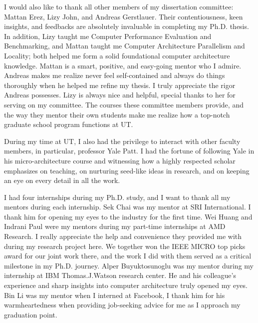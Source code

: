 \begin{acknowledgments}
I would also like to thank all other members of my dissertation committee: Mattan Erez, Lizy John, and Andreas Gerstlauer. Their contentiousness, keen insights, and feedbacks are absolutely invaluable in completing my Ph.D. thesis. In addition, Lizy taught me Computer Performance Evaluation and Benchmarking, and Mattan taught me Computer Architecture Parallelism and Locality; both helped me form a solid foundational computer architecture knowledge. Mattan is a smart, positive, and easy-going mentor who I admire. Andreas makes me realize never feel self-contained and always do things thoroughly when he helped me refine my thesis. I truly appreciate the rigor Andreas possesses. Lizy is always nice and helpful, special thanks to her for serving on my committee. The courses these committee members provide, and the way they mentor their own students make me realize how a top-notch graduate school program functions at UT.

During my time at UT, I also had the privilege to interact with other faculty members, in particular, professor Yale Patt. I had the fortune of following Yale in his micro-architecture course and witnessing how a highly respected scholar emphasizes on teaching, on nurturing seed-like ideas in research, and on keeping an eye on every detail in all the work. 

I had four internships during my Ph.D. study, and I want to thank all my mentors during each internship. Sek Chai was my mentor at SRI International. I thank him for opening my eyes to the industry for the first time. Wei Huang and Indrani Paul were my mentors during my part-time internships at AMD Research. I really appreciate the help and convenience they provided me with during my research project here. We together won the IEEE MICRO top picks award for our joint work there, and the work I did with them served as a critical milestone in my Ph.D. journey. Alper Buyuktosunoglu was my mentor during my internship at IBM Thomas.J.Watson research center. He and his colleague's experience and sharp insights into computer architecture truly opened my eyes. Bin Li was my mentor when I interned at Facebook, I thank him for his warmheartedness when providing job-seeking advice for me as I approach my graduation point.



\end{acknowledgments}
